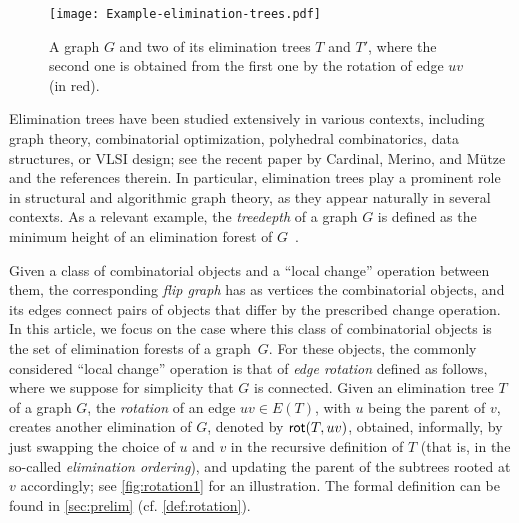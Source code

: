 \documentclass[a4paper,UKenglish,cleveref, autoref, thm-restate]{lipics-v2021}
\newcommand{\rot}{{\sf rot}\xspace}
\begin{document}
\begin{figure}[tb]
    \centering
    \vspace{-.15cm}
    \texttt{[image: Example-elimination-trees.pdf]}
    \caption{A graph $G$ and two of its elimination trees $T$ and $T'$, where the second one is obtained from the first one by the rotation of edge $uv$ (in red).
    \label{fig:eliminationtree}}
\end{figure}







Elimination trees have been studied extensively in various contexts, including graph theory, combinatorial optimization, polyhedral combinatorics, data structures, or VLSI design; see the recent paper by Cardinal, Merino, and M{\"u}tze~\cite{cardinal2022efficient} and the references therein. In particular, elimination trees play a prominent role in structural and algorithmic graph theory, as they appear naturally in several contexts. As a relevant example, the \textit{treedepth} of a graph $G$ is defined as the minimum height of an elimination forest of $G$~\cite{books/daglib/0030491}. 






Given a class of combinatorial objects and a ``local change'' operation between them, the corresponding \emph{flip graph} has as vertices the combinatorial objects, and its edges connect pairs of objects that differ by the prescribed change operation. In this article, we focus on the case where this class of combinatorial objects is the set of elimination forests of a graph~$G$. For these objects,  the  commonly considered  ``local change'' operation is that of \emph{edge rotation} defined as follows, where we suppose for simplicity that $G$ is connected.  Given an elimination tree $T$ of a graph $G$, the \emph{rotation} of an edge $uv \in E(T)$, with $u$ being the parent of $v$, creates another elimination of $G$, denoted by $\rot(T,uv)$, obtained, informally, by just swapping the choice of $u$ and $v$ in the recursive definition of $T$ (that is, in the so-called \emph{elimination ordering}), and updating the parent of the subtrees rooted at $v$ accordingly;  see \autoref{fig:rotation1} for an illustration. The formal definition can be found in \autoref{sec:prelim} (cf. \autoref{def:rotation}).
\end{document}
